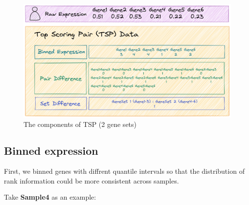 \documentclass[
  12pt,
]{book}
\begin{document}
\begin{figure}

{\centering \includegraphics[width=0.85\linewidth]{./fig/TSP} 

}

\caption{The components of TSP (2 gene sets)}\label{fig:tsp}
\end{figure}

\hypertarget{binned-expression}{%
\subsection{Binned expression}\label{binned-expression}}

First, we binned genes with diffrent quantile intervals so that the distribution of rank information could be more consistent across samples.

Take \textbf{Sample4} as an example:
\end{document}

